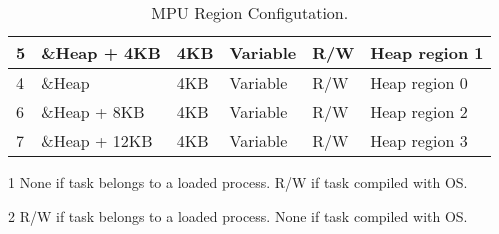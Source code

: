 \begin{table}[htbp]
\begin{minipage}{10cm}
\begin{threeparttable}[t]
\begin{tabular}{|l|l|l|l|l|l|}
    5                 & \&Heap + 4KB                                        & 4KB                                                 & Variable\tnote{2}                          & R/W                                      & Heap region 1                                                                    \\ \hline
    4                 & \&Heap                                              & 4KB                                                 & Variable\tnote{2}                          & R/W                                      & Heap region 0                                                                    \\ \hline
    6                 & \&Heap + 8KB                                        & 4KB                                                 & Variable\tnote{2}                          & R/W                                      & Heap region 2                                                                    \\ \hline
    7                 & \&Heap + 12KB                                       & 4KB                                                 & Variable\tnote{2}                          & R/W                                      & Heap region 3                                                                    \\ \hline
    \end{tabular}
    \begin{tablenotes}
        \item[1] None if task belongs to a loaded process. R/W if task compiled with OS.
        \item[2] R/W if task belongs to a loaded process. None if task compiled with OS.
   \end{tablenotes}
\end{threeparttable}
\end{minipage}
    \caption{MPU Region Configutation.}
    \label{table:mpu_cfg}
\end{table}

